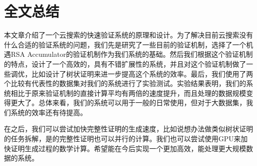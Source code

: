 \chapter{全文总结}
\label{chap:conclusion}

本文章介绍了一个云搜索的快速验证系统的原理和设计。为了解决目前云搜索没有什么合适的验证系统的问题，我们先是研究了一些目前的验证机制，选择了一个机遇RSA Accumulator的验证机制作为我们系统的基础。然后我们根据这个验证机制的特点，设计了一个高效的，具有不错扩展性的系统，并且对这个验证机制做了一些调优，比如设计了树状证明来进一步提高这个系统的效率。最后，我们使用了两个比较有代表性的数据集对我们的系统进行了实验测试。实验结果表明，我们的系统相比于原来验证机制的直接计算平均有两倍的速度提升，而且处理的数据规模变得更大了。总体来看，我们的系统可以用于一般的日常使用，但对于大数据集，我们系统的效率还有待提高。

在之后，我们可以尝试加快完整性证明的生成速度，比如说想办法做类似树状证明的任务拆解，是的完整性证明也可以并行的计算。我们也可以尝试使用GPU来加快证明生成过程的数学计算。希望能在今后实现一个更加高效，能处理更大规模数据的系统。


